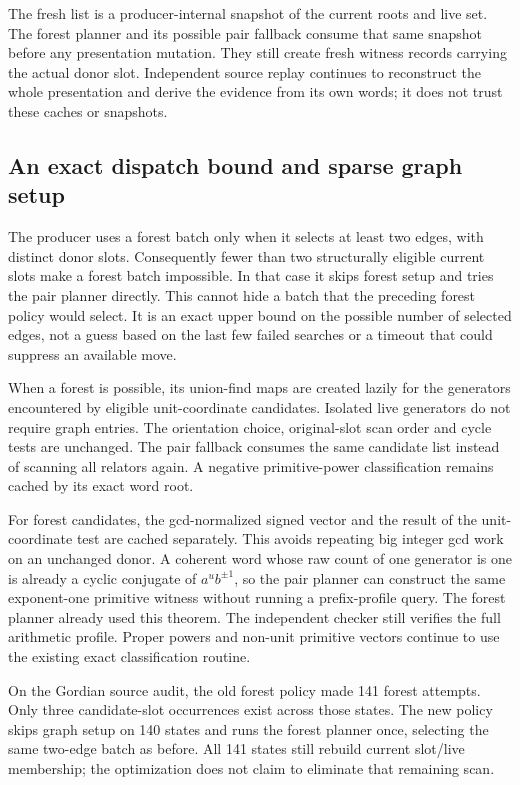 The fresh list is a producer-internal snapshot of the current roots and
live set. The forest planner and its possible pair fallback consume that
same snapshot before any presentation mutation. They still create fresh
witness records carrying the actual donor slot. Independent source replay
continues to reconstruct the whole presentation and derive the evidence
from its own words; it does not trust these caches or snapshots.

\subsection{An exact dispatch bound and sparse graph setup}

The producer uses a forest batch only when it selects at least two edges,
with distinct donor slots. Consequently fewer than two structurally eligible
current slots make a forest batch impossible. In that case it skips forest
setup and tries the pair planner directly. This cannot hide a batch that
the preceding forest policy would select. It is an exact upper bound on
the possible number of selected edges, not a guess based on the last few
failed searches or a timeout that could suppress an available move.

When a forest is possible, its union-find maps are created lazily for the
generators encountered by eligible unit-coordinate candidates. Isolated live
generators do not require graph entries. The orientation choice, original-slot
scan order and cycle tests are unchanged. The pair fallback consumes the
same candidate list instead of scanning all relators again. A negative
primitive-power classification remains cached by its exact word root.

For forest candidates, the gcd-normalized signed vector and the result of
the unit-coordinate test are cached separately. This avoids repeating big
integer gcd work on an unchanged donor. A coherent word whose raw count of
one generator is one is already a cyclic conjugate of $a^u b^{\pm1}$,
so the pair planner can construct the same exponent-one primitive witness
without running a prefix-profile query. The forest planner already used
this theorem. The independent checker still verifies the full arithmetic
profile. Proper powers and non-unit primitive vectors continue to use the
existing exact classification routine.

On the Gordian source audit, the old forest policy made 141 forest attempts.
Only three candidate-slot occurrences exist across those states. The new
policy skips graph setup on 140 states and runs the forest planner once,
selecting the same two-edge batch as before. All 141 states still rebuild
current slot/live membership; the optimization does not claim to eliminate
that remaining scan.

